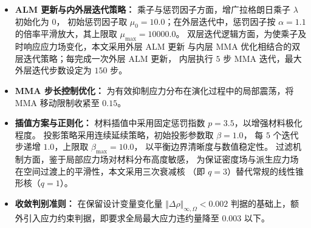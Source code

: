 \begin{itemize}
	\item \textbf{ALM 更新与内外层迭代策略：}
	乘子与惩罚因子方面，增广拉格朗日乘子 $\lambda$ 初始化为 $0$，
	初始惩罚因子取 $\mu_0=10.0$；在外层迭代中，惩罚因子按 $\alpha=1.1$
	的倍率平滑放大，其上限取 $\mu_{\max}=10000.0$。
	双层迭代逻辑方面，为使乘子及时响应应力场变化，本文采用外层 ALM 更新
	与内层 MMA 优化相结合的双层迭代策略；每完成一次外层 ALM 更新，
	内层执行 $5$ 步 MMA 迭代，最大外层迭代步数设定为 $150$ 步。
	
	\item \textbf{MMA 步长控制优化：}
	为有效抑制应力分布在演化过程中的局部震荡，将 MMA 移动限制收紧至 $0.15$。
	
	\item \textbf{插值方案与正则化：}
	材料插值中采用固定惩罚指数 $p=3.5$，以增强材料极化程度。
	投影策略采用连续延续策略，初始投影参数取 $\beta=1.0$，
	每 $5$ 个迭代步递增 $1.0$，上限取 $\beta_{\max}=10.0$，
	以平衡边界清晰度与数值稳定性。
	过滤机制方面，鉴于局部应力场对材料分布高度敏感，
	为保证密度场与派生应力场在空间过渡上的平滑性，本文采用三次衰减核
	（即 $q=3$）替代常规的线性锥形核（$q=1$）。
	
	\item \textbf{收敛判别准则：}
	在保留设计变量变化量 $\Vert\Delta\rho\Vert_{\infty,\Omega}<0.002$
	判据的基础上，额外引入应力约束判据，即要求全局最大应力违约量降至
	$0.003$ 以下。
\end{itemize}
%		
%	
%	
%		
%		
%	


